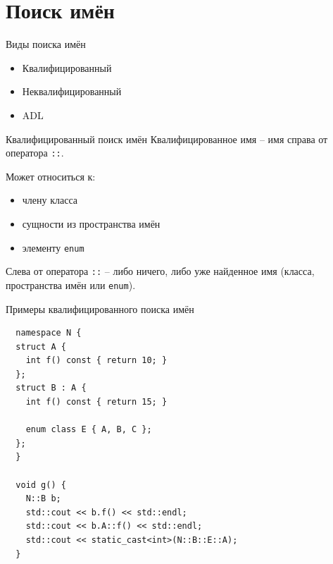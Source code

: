 \documentclass[unknownkeysallowed,xcolor=table]{beamer}
\begin{document}
\section{Поиск имён}

\begin{frame}{Виды поиска имён}
  \begin{itemize}
    \item Квалифицированный \vspace{2em}
    \item Неквалифицированный \vspace{2em}
    \item ADL
  \end{itemize}
\end{frame}

\begin{frame}{Квалифицированный поиск имён}
  Квалифицированное имя -- имя справа от оператора \lstinline{::}.

  \vspace{1em}

  Может относиться к:

  \vspace{0.5em}

  \begin{itemize}
    \item члену класса \vspace{0.5em}
    \item сущности из пространства имён \vspace{0.5em}
    \item элементу \lstinline{enum}
  \end{itemize}

  \vspace{1em}

  Слева от оператора \lstinline{::} -- либо ничего, либо уже найденное имя (класса, пространства имён или \lstinline{enum}).
\end{frame}

\begin{frame}[fragile]{Примеры квалифицированного поиска имён}
  \begin{lstlisting}
  namespace N {   
  struct A {
    int f() const { return 10; }
  };
  struct B : A {
    int f() const { return 15; }

    enum class E { A, B, C };
  };
  }

  void g() {
    N::B b;
    std::cout << b.f() << std::endl;
    std::cout << b.A::f() << std::endl;
    std::cout << static_cast<int>(N::B::E::A);
  }
  \end{lstlisting}
\end{frame}
\end{document}
